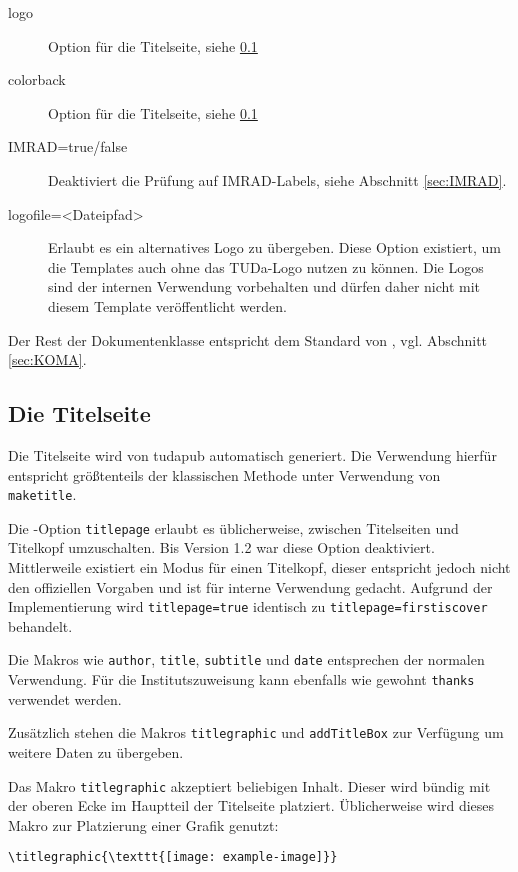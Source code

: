 \documentclass[
	ngerman,
	accentcolor=9c,%
	]{tudapub}
\let\code\texttt
\begin{document}
\begin{description}
	\item[logo] Option für die Titelseite, siehe \ref{sec:title}
	\item[colorback] Option für die Titelseite, siehe \ref{sec:title}
	\item[IMRAD=true/false] Deaktiviert die Prüfung auf IMRAD-Labels, siehe Abschnitt \ref{sec:IMRAD}.
	\item[logofile=<Dateipfad>] Erlaubt es ein alternatives Logo zu übergeben. Diese Option existiert, um die Templates auch ohne das TUDa-Logo nutzen zu können. Die Logos sind der internen Verwendung vorbehalten und dürfen daher nicht mit diesem Template veröffentlicht werden.
\end{description}

\noindent Der Rest der Dokumentenklasse entspricht dem Standard von \KOMAScript, vgl. Abschnitt \ref{sec:KOMA}.

\subsection{Die Titelseite}
\label{sec:title}

Die Titelseite wird von tudapub automatisch generiert. Die Verwendung hierfür entspricht größtenteils der klassischen Methode unter Verwendung von \code{maketitle}.

Die \KOMAScript-Option \code{titlepage} erlaubt es üblicherweise, zwischen Titelseiten und Titelkopf umzuschalten. Bis Version 1.2 war diese Option deaktiviert. Mittlerweile existiert ein Modus für einen Titelkopf, dieser entspricht jedoch nicht den offiziellen Vorgaben und ist für interne Verwendung gedacht. Aufgrund der Implementierung wird \code{titlepage=true} identisch zu \code{titlepage=firstiscover} behandelt.

Die Makros wie \code{author}, \code{title}, \code{subtitle} und \code{date} entsprechen der normalen Verwendung. Für die Institutszuweisung kann ebenfalls wie gewohnt \code{thanks} verwendet werden.

Zusätzlich stehen die Makros \code{titlegraphic} und \code{addTitleBox} zur Verfügung um weitere Daten zu übergeben.

Das Makro \code{titlegraphic} akzeptiert beliebigen Inhalt. Dieser wird bündig mit der oberen Ecke im Hauptteil der Titelseite platziert.
Üblicherweise wird dieses Makro zur Platzierung einer Grafik genutzt:

\begin{verbatim}
\titlegraphic{\texttt{[image: example-image]}}
\end{verbatim}
\end{document}
